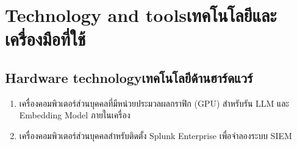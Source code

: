 
\section{\ifenglish Technology and tools\else เทคโนโลยีและเครื่องมือที่ใช้\fi}

\subsection{\ifenglish Hardware technology\else เทคโนโลยีด้านฮาร์ดแวร์\fi}
\begin{enumerate}
    \item เครื่องคอมพิวเตอร์ส่วนบุคคลที่มีหน่วยประมวลผลกราฟิก (GPU)
          สำหรับรัน LLM และ Embedding Model ภายในเครื่อง

    \item เครื่องคอมพิวเตอร์ส่วนบุคคลสำหรับติดตั้ง
          Splunk Enterprise เพื่อจำลองระบบ SIEM
\end{enumerate}

